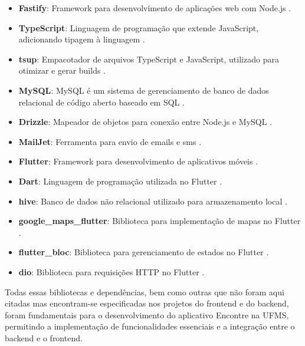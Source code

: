 \begin{itemize}
  \item \textbf{Fastify}: Framework para desenvolvimento de aplicações web com Node.js \cite{fastify}.
  \item \textbf{TypeScript}: Linguagem de programação que extende JavaScript, adicionando tipagem à linguagem \cite{typescript}.
  \item \textbf{tsup}: Empacotador de arquivos TypeScript e JavaScript, utilizado para otimizar e gerar builds \cite{tsup}.
  \item \textbf{MySQL}: MySQL é um sistema de gerenciamento de banco de dados relacional de código aberto baseado em SQL \cite{mysql}.
  \item \textbf{Drizzle}: Mapeador de objetos para conexão entre Node.js e MySQL \cite{drizzle}.
  \item \textbf{MailJet}: Ferramenta para envio de emails e sms \cite{mailjet}.
  \item \textbf{Flutter}: Framework para desenvolvimento de aplicativos móveis \cite{flutter}.
  \item \textbf{Dart}: Linguagem de programação utilizada no Flutter \cite{dart}.
  \item \textbf{hive}: Banco de dados não relacional utilizado para armazenamento local \cite{hive}.
  \item \textbf{google\_maps\_flutter}: Biblioteca para implementação de mapas no Flutter \cite{googlemapsflutter}.
  \item \textbf{flutter\_bloc}: Biblioteca para gerenciamento de estados no Flutter \cite{flutterbloc}.
  \item \textbf{dio}: Biblioteca para requisições HTTP no Flutter \cite{dio}.
\end{itemize}

Todas essas bibliotecas e dependências, bem como outras que não foram aqui citadas mas encontram-se especificadas nos projetos do frontend e do backend, foram fundamentais para o desenvolvimento do aplicativo Encontre na UFMS, permitindo a implementação de funcionalidades essenciais e a integração entre o backend e o frontend.